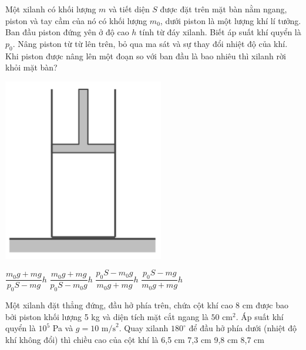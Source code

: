 \documentclass[12pt,a4paper]{article}
\begin{document}
\begin{multicols}{2}
	\begin{ex}
		Một xilanh có khối lượng $m$ và tiết diện $S$ được đặt trên mặt bàn nằm ngang, piston và tay cầm của nó có khối lượng $m_0$, dưới piston là một lượng khí lí tưởng. Ban đầu piston đứng yên ở độ cao $h$ tính từ đáy xilanh. Biết áp suất khí quyển là $p_0$. Nâng piston từ từ lên trên, bỏ qua ma sát và sự thay đổi nhiệt độ của khí. Khi piston được nâng lên một đoạn so với ban đầu là bao nhiêu thì xilanh rời khỏi mặt bàn?
			\begin{center}
			\includegraphics[scale=0.3]{img/5.png}
		\end{center}
		\choice
		{$\dfrac{m_0g+mg}{p_0S-mg}h$}
		{$\dfrac{m_0g+mg}{p_0S-m_0g}h$}
		{$\dfrac{p_0S-m_0g}{m_0g+mg}h$}
		{$\dfrac{p_0S-mg}{m_0g+mg}h$}
	\end{ex}
	
	\begin{ex}
		Một xilanh đặt thẳng đứng, đầu hở phía trên, chứa cột khí cao 8 cm được bao bởi piston khối lượng 5 kg và diện tích mặt cắt ngang là $50 \text{ cm}^2$. Áp suất khí quyển là $10^5$ Pa và $g=10 \text{ m/s}^2$. Quay xilanh $180^\circ$ để đầu hở phía dưới (nhiệt độ khí không đổi) thì chiều cao của cột khí là
		\choice
		{6,5 cm}
		{7,3 cm}
		{9,8 cm}
		{8,7 cm}
	\end{ex}
	

\end{multicols}
\end{document}
